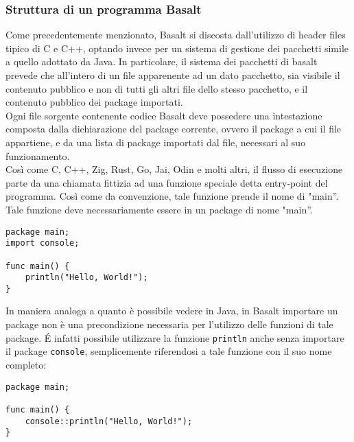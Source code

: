 \subsubsection{Struttura di un programma Basalt}
Come precedentemente menzionato, Basalt si discosta dall'utilizzo di header files tipico di C e C++, optando invece per un sistema di gestione dei pacchetti simile a quello adottato da Java. In particolare, 
il sistema dei pacchetti di basalt prevede che all’intero di un file apparenente ad un dato pacchetto, sia visibile il contenuto pubblico e non di tutti gli altri file dello stesso pacchetto, e il contenuto 
pubblico dei package importati. \\

Ogni file sorgente contenente codice Basalt deve possedere una intestazione composta dalla dichiarazione del package corrente, ovvero il package a cui il file appartiene, e 
da una lista di package importati dal file, necessari al suo funzionamento. \\
 
Così come C, C++, Zig, Rust, Go, Jai, Odin e molti altri, il flusso di esecuzione parte da una chiamata fittizia ad una funzione speciale detta entry-point del programma. Così 
come da convenzione, tale funzione prende il nome di "main”. Tale funzione deve necessariamente essere in un package di nome "main”. \\


\begin{lstlisting}[frame=single]
package main;
import console;

func main() {
    println("Hello, World!");
}
\end{lstlisting}

\vspace{0.5cm}

In maniera analoga a quanto è possibile vedere in Java, in Basalt importare un package non 
è una precondizione necessaria per l'utilizzo delle funzioni di tale package. É infatti possibile
utilizzare la funzione \texttt{println} anche senza importare il package \texttt{console}, semplicemente riferendosi
a tale funzione con il suo nome completo: \\

\begin{lstlisting}[frame=single]
package main;

func main() {
    console::println("Hello, World!");
}
\end{lstlisting}
    